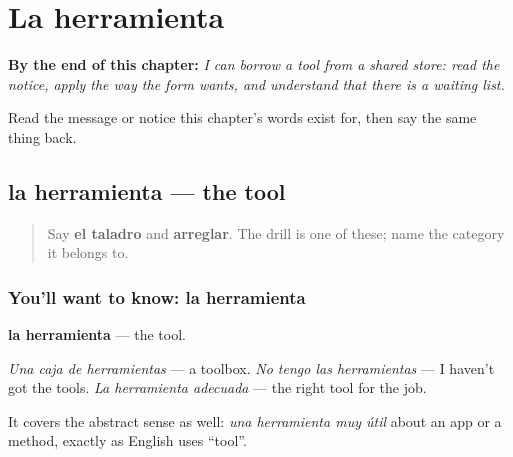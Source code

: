 
\chapter{La herramienta}
\label{ch:es-pedir}

\begin{chapteropening}
\textbf{By the end of this chapter:} \emph{I can borrow a tool from a shared store: read the notice, apply the way the form wants, and understand that there is a waiting list.}

Read the message or notice this chapter's words exist for, then say the same thing back.
\end{chapteropening}

\section[la herramienta]{la herramienta — the tool}

\label{lesson:ES-C460-herramienta}



\begin{quote}
Say \textbf{el taladro} and \textbf{arreglar}. The drill is one of these; name the category it belongs to.
\end{quote}

\subsection*{You'll want to know: la herramienta}
\textbf{la herramienta} — the tool.

\emph{Una caja de herramientas} — a toolbox. \emph{No tengo las herramientas} — I haven't got the tools. \emph{La herramienta adecuada} — the right tool for the job.

It covers the abstract sense as well: \emph{una herramienta muy útil} about an app or a method, exactly as English uses \textquotedblleft{}tool\textquotedblright{}.

